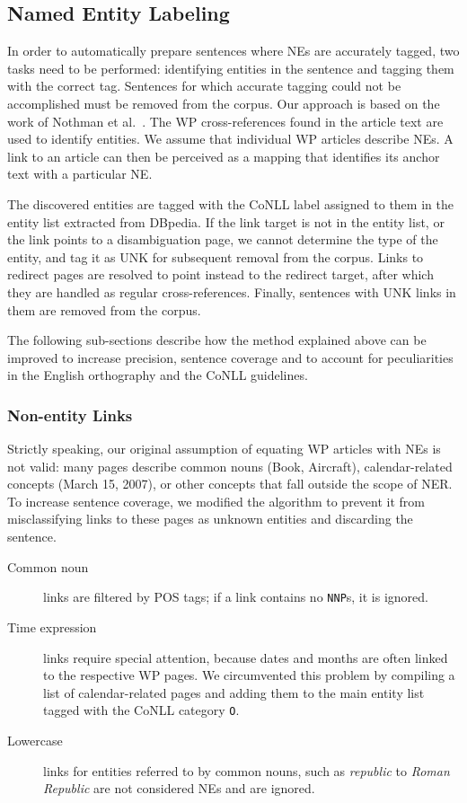 \documentclass[11pt]{article}
\begin{document}

\subsection{Named Entity Labeling}

In order to automatically prepare sentences where NEs are accurately tagged,
two tasks need to be performed: identifying entities in the sentence and
tagging them with the correct tag. Sentences for which accurate tagging could
not be accomplished must be removed from the corpus. Our approach is based on
the work of Nothman et al.~. The WP cross-references
found in the article text are used to identify entities. We assume that
individual WP articles describe NEs. A link to an article can then be
perceived as a mapping that identifies its anchor text with a particular NE.

The discovered entities are tagged with the CoNLL label assigned to them in
the entity list extracted from DBpedia. If the link target is not in the
entity list, or the link points to a disambiguation page, we cannot determine
the type of the entity, and tag it as UNK for subsequent removal from the
corpus. Links to redirect pages are resolved to point instead to the redirect
target, after which they are handled as regular cross-references. Finally, sentences with UNK links in them are removed from the corpus.

The following sub-sections describe how the method explained above can be
improved to increase precision, sentence coverage and to account for
peculiarities in the English orthography and the CoNLL guidelines.

\subsubsection{Non-entity Links}

Strictly speaking, our original assumption of equating WP articles with NEs is not valid: many pages describe common nouns (Book, Aircraft), calendar-related concepts (March 15, 2007), or other concepts that fall outside the scope of NER. To increase sentence coverage, we modified the algorithm to prevent it from misclassifying links to these pages as unknown entities and discarding the sentence.

\begin{description}
\item[Common noun] links are filtered by POS tags; if a link contains no \texttt{NNP}s, it is ignored.
\item[Time expression] links require special attention, because dates and
  months are often linked to the respective WP pages. We circumvented this
  problem by compiling a list of calendar-related pages and adding them to the
  main entity list tagged with the CoNLL category \texttt{O}.
\item[Lowercase] links for entities referred to by common nouns, such as \textit{republic} to \textit{Roman Republic} are not considered NEs and are ignored.
\end{description}
\end{document}
